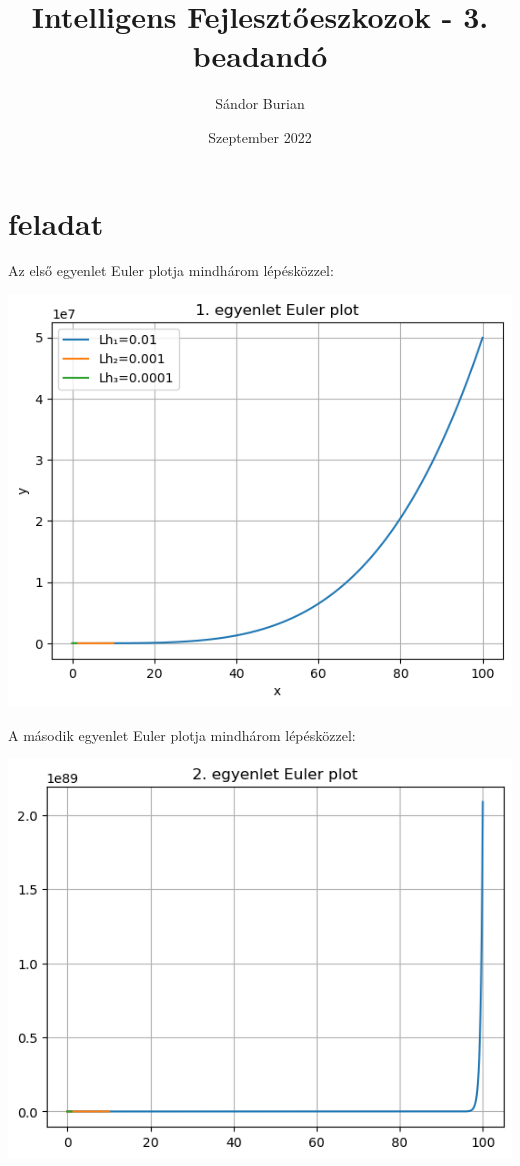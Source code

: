 \documentclass{article}
\title{Intelligens Fejlesztőeszkozok - 3. beadandó}
\author{Sándor Burian}
\date{Szeptember 2022}
\begin{document}
\maketitle

\section{feladat}

Az első egyenlet Euler plotja mindhárom lépésközzel:

\includegraphics[scale=1]{../plot_3.png} 

A második egyenlet Euler plotja mindhárom lépésközzel:

\includegraphics[scale=1]{../plot_4.png} 
\end{document}
